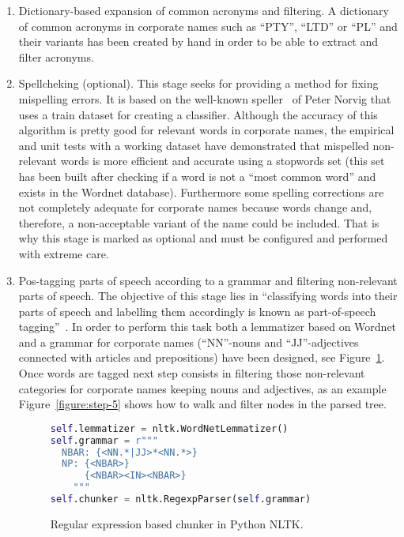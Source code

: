 \documentclass{llncs}
\begin{document}
\begin{enumerate}
\item Dictionary-based expansion of common acronyms and filtering. A dictionary of common acronyms in corporate 
names such as ``PTY'', ``LTD'' or ``PL'' and their variants has been created by hand in order to be able to extract and filter acronyms. 

\item Spellcheking (optional). This stage seeks for providing a method for fixing mispelling errors. It is based on the 
well-known speller~\cite{NorvigSpelling} of Peter Norvig that uses a train dataset for creating a classifier. Although the accuracy of this 
algorithm is pretty good for relevant words in corporate names, the empirical and unit tests with a working dataset 
have demonstrated that mispelled non-relevant words is more efficient and accurate using a stopwords set (this set has been 
built after checking if a word is not a ``most common word'' and exists in the Wordnet database). Furthermore some spelling corrections 
are not completely adequate for corporate names because words change and, therefore, a non-acceptable variant of the name 
could be included. That is why this stage is marked as optional and must be configured and performed with extreme care.

\item Pos-tagging parts of speech according to a grammar and filtering non-relevant parts of speech. The objective 
of this stage lies in ``classifying words into their parts of speech and labelling them accordingly is known as part-of-speech tagging''~\cite{LoperBird02}. In order 
to perform this task both a lemmatizer based on Wordnet and a grammar for corporate names (``NN''-nouns and ``JJ''-adjectives connected with articles and 
prepositions) have been designed, see Figure~\ref{figure:step-4}. Once words are tagged next step consists in filtering those non-relevant categories 
for corporate names keeping nouns and adjectives, as an example Figure~\ref{figure:step-5} shows how to walk and filter nodes in the parsed tree.

\begin{figure}[!h]
\begin{center}
\begin{lstlisting}[language=Python]  
self.lemmatizer = nltk.WordNetLemmatizer()
self.grammar = r"""
  NBAR: {<NN.*|JJ>*<NN.*>}   
  NP: {<NBAR>}
      {<NBAR><IN><NBAR>} 
    """
self.chunker = nltk.RegexpParser(self.grammar)
\end{lstlisting}
\caption{Regular expression based chunker in Python NLTK.}
\label{figure:step-4}
\end{center}
\end{figure}   
  

\end{enumerate}
\end{document}
